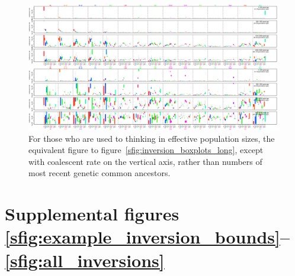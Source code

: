 \documentclass{article}
\begin{document}
\begin{figure}[!htp]
  \begin{center}
    
    \vspace{2em}
    \begin{center}
      \includegraphics[angle=90,height=.9\textheight]{inversion-boxplots-long-coal}
    \end{center}
    \vspace{2em}
    \caption{
    For those who are used to thinking in effective population sizes,
    the equivalent figure to figure~\ref{sfig:inversion_boxplots_long},
    except with coalescent rate on the vertical axis, 
    rather than numbers of most recent genetic common ancestors.
    \label{sfig:inversion_boxplots_long_coal}
    }
  \end{center}
\end{figure}

\section*{Supplemental figures \ref{sfig:example_inversion_bounds}--\ref{sfig:all_inversions}}
\end{document}
